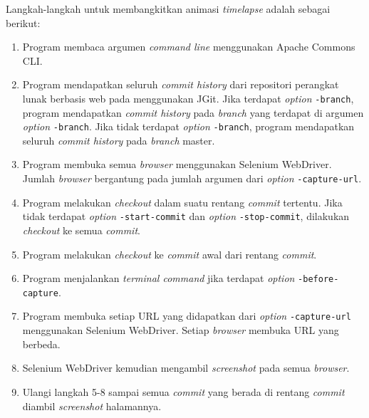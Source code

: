 

Langkah-langkah untuk membangkitkan animasi \textit{timelapse} adalah sebagai berikut:\\
\begin{enumerate}
\item Program membaca argumen \textit{command line} menggunakan Apache Commons CLI.
\item Program mendapatkan seluruh \textit{commit history} dari repositori perangkat lunak berbasis web pada  menggunakan JGit. Jika terdapat \textit{option} \texttt{-branch}, program mendapatkan \textit{commit history} pada \textit{branch} yang terdapat di argumen \textit{option} \texttt{-branch}. Jika tidak terdapat \textit{option} \texttt{-branch}, program mendapatkan seluruh \textit{commit history} pada \textit{branch} master. 
\item Program membuka semua \textit{browser} menggunakan Selenium WebDriver. Jumlah \textit{browser} bergantung pada jumlah argumen dari \textit{option} \texttt{-capture-url}.
\item Program melakukan \textit{checkout} dalam suatu rentang \textit{commit} tertentu. Jika tidak terdapat \textit{option} \texttt{-start-commit} dan \textit{option} \texttt{-stop-commit}, dilakukan \textit{checkout} ke semua \textit{commit}.
\item Program melakukan \textit{checkout} ke \textit{commit} awal dari rentang \textit{commit}. 
\item Program menjalankan \textit{terminal command} jika terdapat \textit{option} \texttt{-before-capture}.
\item Program membuka setiap URL yang didapatkan dari \textit{option} \texttt{-capture-url} menggunakan Selenium WebDriver. Setiap \textit{browser} membuka URL yang berbeda.
\item Selenium WebDriver kemudian mengambil \textit{screenshot} pada semua \textit{browser}.
\item Ulangi langkah 5-8 sampai semua \textit{commit} yang berada di rentang \textit{commit} diambil \textit{screenshot} halamannya.

\end{enumerate}

